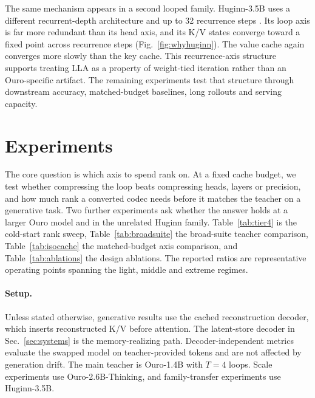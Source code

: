 \documentclass[10pt]{article}
\newcommand{\lla}{LLA}
\begin{document}
\FigureHuginn
The same mechanism appears in a second looped family. Huginn-3.5B uses a different recurrent-depth architecture and up to 32 recurrence steps \citep{geiping2025huginn}. Its loop axis is far more redundant than its head axis, and its K/V states converge toward a fixed point across recurrence steps (Fig.~\ref{fig:whyhuginn}). The value cache again converges more slowly than the key cache. This recurrence-axis structure supports treating \lla{} as a property of weight-tied iteration rather than an Ouro-specific artifact. The remaining experiments test that structure through downstream accuracy, matched-budget baselines, long rollouts and serving capacity.

\section{Experiments}
\label{sec:experiments}
The core question is which axis to spend rank on. At a fixed cache budget, we test whether compressing the loop beats compressing heads, layers or precision, and how much rank a converted codec needs before it matches the teacher on a generative task. Two further experiments ask whether the answer holds at a larger Ouro model and in the unrelated Huginn family. Table~\ref{tab:tier4} is the cold-start rank sweep, Table~\ref{tab:broadsuite} the broad-suite teacher comparison, Table~\ref{tab:isocache} the matched-budget axis comparison, and Table~\ref{tab:ablations} the design ablations. The reported ratios are representative operating points spanning the light, middle and extreme regimes.

\paragraph{Setup.}
Unless stated otherwise, generative results use the cached reconstruction decoder, which inserts reconstructed K/V before attention. The latent-store decoder in Sec.~\ref{sec:systems} is the memory-realizing path. Decoder-independent metrics evaluate the swapped model on teacher-provided tokens and are not affected by generation drift. The main teacher is Ouro-1.4B with $T=4$ loops. Scale experiments use Ouro-2.6B-Thinking, and family-transfer experiments use Huginn-3.5B.
\end{document}
